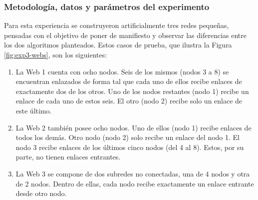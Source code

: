             \subsubsection*{Metodología, datos y parámetros del experimento}
            Para esta experiencia se construyeron artificialmente tres redes pequeñas, pensadas con el objetivo de poner de manifiesto y observar las diferencias entre los dos algoritmos planteados. Estos casos de prueba, que ilustra la Figura \ref{fig:exp3-webs}, son los siguientes:
            \begin{enumerate}[label=(\alph*)]
                \item La Web 1 cuenta con ocho nodos. Seis de los mismos (nodos 3 a 8) se encuentran enlazados de forma tal que cada uno de ellos recibe enlaces de exactamente dos de los otros. Uno de los nodos restantes (nodo 1) recibe un enlace de cada uno de estos seis. El otro (nodo 2) recibe solo un enlace de este último.
                \item La Web 2 también posee ocho nodos. Uno de ellos (nodo 1) recibe enlaces de todos los demás. Otro nodo (nodo 2) solo recibe un enlace del nodo 1. El nodo 3 recibe enlaces de los últimos cinco nodos (del 4 al 8). Estos, por su parte, no tienen enlaces entrantes.
                \item La Web 3 se compone de dos subredes no conectadas, una de 4 nodos y otra de 2 nodos. Dentro de ellas, cada nodo recibe exactamente un enlace entrante desde otro nodo.
            \end{enumerate}

